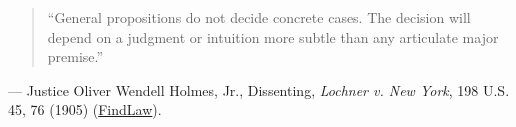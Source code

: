 \documentclass[12pt]{article}
\begin{document}
\begin{quote}
``General propositions do not decide concrete cases. The decision will depend on a judgment or intuition more subtle than any articulate major premise.''
\end{quote}
\noindent --- Justice Oliver Wendell Holmes, Jr., Dissenting, \textit{Lochner v. New York}, 198 U.S. 45, 76 (1905) (\href{https://caselaw.findlaw.com/court/us-supreme-court/198/45.html}{FindLaw}).
\end{document}
